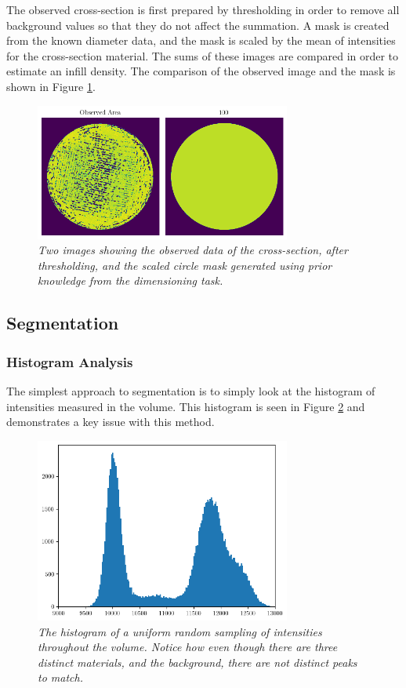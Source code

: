 \documentclass[11pt, letterpaper]{article}
\begin{document}
    The observed cross-section is first prepared by thresholding in order to remove all background values so that they do not affect the summation. A mask is created from the known diameter data, and the mask is scaled by the mean of intensities for the cross-section material. The sums of these images are compared in order to estimate an infill density. The comparison of the observed image and the mask is shown in Figure \ref{fig:circle-mask}.

    \begin{figure}[H]
        \centering
        \label{fig:circle-mask}
        \includegraphics[width=0.75\textwidth]{circle_mask.png}
        \caption{\emph{Two images showing the observed data of the cross-section, after thresholding, and the scaled circle mask generated using prior knowledge from the dimensioning task.}}
    \end{figure}

\subsection{Segmentation}
    \subsubsection{Histogram Analysis}
        The simplest approach to segmentation is to simply look at the histogram of intensities measured in the volume. This histogram is seen in Figure \ref{fig:histogram} and demonstrates a key issue with this method.

        \begin{figure}[H]
            \centering
            \label{fig:histogram}
            \includegraphics[width=0.75\textwidth]{histogram.png}
            \caption{\emph{The histogram of a uniform random sampling of intensities throughout the volume. Notice how even though there are three distinct materials, and the background, there are not distinct peaks to match.}}
        \end{figure}
\end{document}
